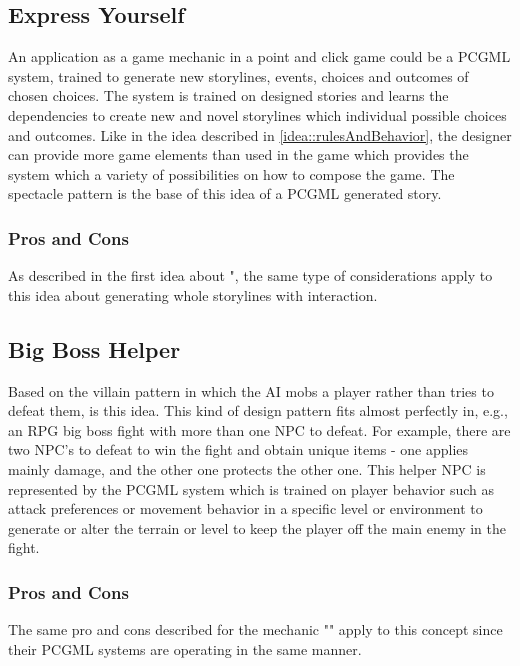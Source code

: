 \documentclass[MGS,Master,english]{twbook}%
\begin{document}
\subsection{Express Yourself} \label{idea::expressYourself}
An application as a game mechanic in a point and click game could be a PCGML system, trained to generate new storylines, events, choices and outcomes of chosen choices. The system is trained on designed stories and learns the dependencies to create new and novel storylines which individual possible choices and outcomes. Like in the idea described in \ref{idea::rulesAndBehavior}, the designer can provide more game elements than used in the game which provides the system which a variety of possibilities on how to compose the game. The spectacle pattern is the base of this idea of a PCGML generated story.

\subsubsection{Pros and Cons}
As described in the first idea about ", the same type of considerations apply to this idea about generating whole storylines with interaction.


\subsection{Big Boss Helper} \label{idea::bigBossHelper}
Based on the villain pattern in which the AI mobs a player rather than tries to defeat them, is this idea. This kind of design pattern fits almost perfectly in, e.g., an RPG big boss fight with more than one \ac{NPC} to defeat. For example, there are two NPC’s to defeat to win the fight and obtain unique items - one applies mainly damage, and the other one protects the other one. This helper NPC is represented by the PCGML system which is trained on player behavior such as attack preferences or movement behavior in a specific level or environment to generate or alter the terrain or level to keep the player off the main enemy in the fight.

\subsubsection{Pros and Cons}
The same pro and cons described for the mechanic "" apply to this concept since their PCGML systems are operating in the same manner.
\end{document}
